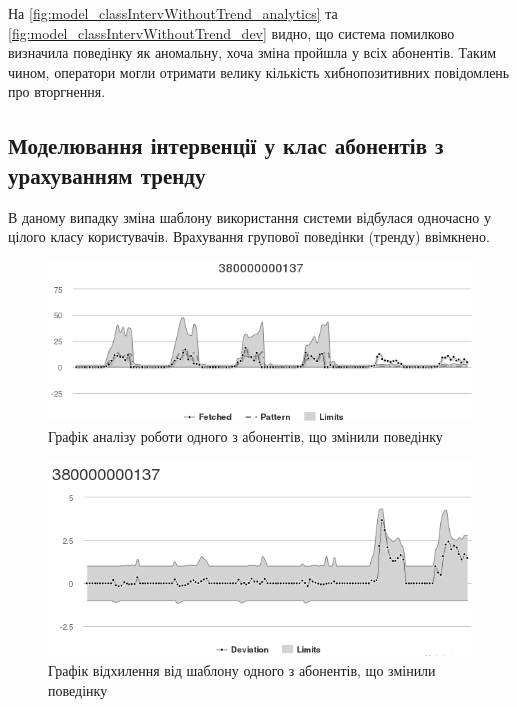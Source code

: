 На \ref{fig:model_classIntervWithoutTrend_analytics} та \ref{fig:model_classIntervWithoutTrend_dev} видно, що система помилково визначила поведінку як аномальну, хоча зміна пройшла у всіх абонентів. Таким чином, оператори могли отримати велику кількість хибнопозитивних повідомлень про вторгнення.

\subsection{Моделювання інтервенції у клас абонентів з урахуванням тренду}

В даному випадку зміна шаблону використання системи відбулася одночасно у цілого класу користувачів. Врахування групової поведінки (тренду) ввімкнено.

\begin{figure}[h!]
        \begin{center}
            \includegraphics[scale=0.55]{resources/classIntervWithTrend/analysis.png}
        \end{center}
        \caption{Графік аналізу роботи одного з абонентів, що змінили поведінку}
        \label{fig:model_classIntervWithTrend_analytics}
\end{figure}

\begin{figure}[h!]
        \begin{center}
            \includegraphics[scale=0.55]{resources/classIntervWithTrend/dev.png}
        \end{center}
        \caption{Графік відхилення від шаблону одного з абонентів, що змінили поведінку}
        \label{fig:model_classIntervWithTrend_dev}
\end{figure}

